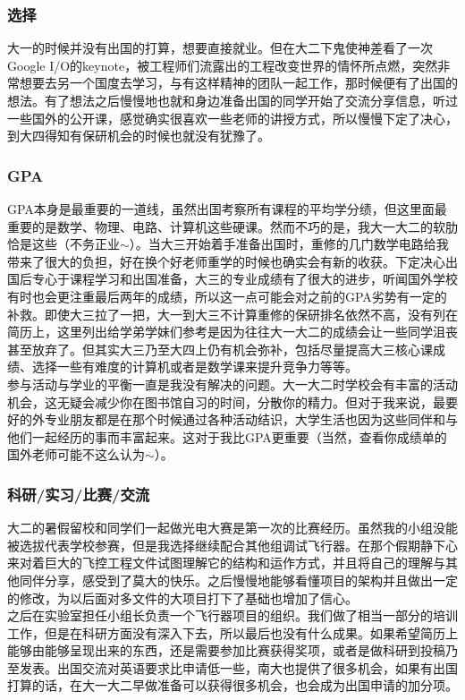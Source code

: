 \documentclass[a4paper,UTF8]{book}
\begin{document}
        \subsubsection*{选择}
        大一的时候并没有出国的打算，想要直接就业。但在大二下鬼使神差看了一次Google I/O的keynote，被工程师们流露出的工程改变世界的情怀所点燃，突然非常想要去另一个国度去学习，与有这样精神的团队一起工作，那时候便有了出国的想法。有了想法之后慢慢地也就和身边准备出国的同学开始了交流分享信息，听过一些国外的公开课，感觉确实很喜欢一些老师的讲授方式，所以慢慢下定了决心，到大四得知有保研机会的时候也就没有犹豫了。
        \subsubsection*{GPA}
        GPA本身是最重要的一道线，虽然出国考察所有课程的平均学分绩，但这里面最重要的是数学、物理、电路、计算机这些硬课。然而不巧的是，我大一大二的软肋恰是这些（不务正业$\sim$）。当大三开始着手准备出国时，重修的几门数学电路给我带来了很大的负担，好在换个好老师重学的时候也确实会有新的收获。下定决心出国后专心于课程学习和出国准备，大三的专业成绩有了很大的进步，听闻国外学校有时也会更注重最后两年的成绩，所以这一点可能会对之前的GPA劣势有一定的补救。即使大三拉了一把，大一到大三不计算重修的保研排名依然不高，没有列在简历上，这里列出给学弟学妹们参考是因为往往大一大二的成绩会让一些同学沮丧甚至放弃了。但其实大三乃至大四上仍有机会弥补，包括尽量提高大三核心课成绩、选择一些有难度的计算机或者是数学课来提升竞争力等等。\\
        参与活动与学业的平衡一直是我没有解决的问题。大一大二时学校会有丰富的活动机会，这无疑会减少你在图书馆自习的时间，分散你的精力。但对于我来说，最要好的外专业朋友都是在那个时候通过各种活动结识，大学生活也因为这些同伴和与他们一起经历的事而丰富起来。这对于我比GPA更重要（当然，查看你成绩单的国外老师可能不这么认为$\sim$）。

        \subsubsection*{科研/实习/比赛/交流}
        大二的暑假留校和同学们一起做光电大赛是第一次的比赛经历。虽然我的小组没能被选拔代表学校参赛，但是我选择继续配合其他组调试飞行器。在那个假期静下心来对着巨大的飞控工程文件试图理解它的结构和运作方式，并且将自己的理解与其他同伴分享，感受到了莫大的快乐。之后慢慢地能够看懂项目的架构并且做出一定的修改，为以后面对多文件的大项目打下了基础也增加了信心。\\
        之后在实验室担任小组长负责一个飞行器项目的组织。我们做了相当一部分的培训工作，但是在科研方面没有深入下去，所以最后也没有什么成果。如果希望简历上能够由能够呈现出来的东西，还是需要参加比赛获得奖项，或者是做科研到投稿乃至发表。出国交流对英语要求比申请低一些，南大也提供了很多机会，如果有出国打算的话，在大一大二早做准备可以获得很多机会，也会成为出国申请的加分项。
\end{document}

